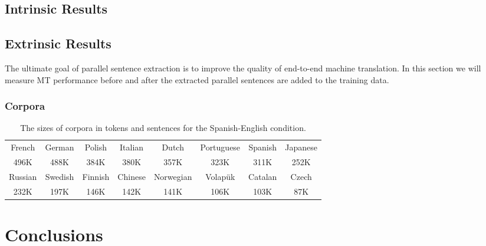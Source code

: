 \subsection{Intrinsic Results}

\subsection{Extrinsic Results}
The ultimate goal of parallel sentence extraction is to improve the quality of
end-to-end machine translation. In this section we will measure MT performance
before and after the extracted parallel sentences are added to the training
data.

\subsubsection{Corpora}
\begin{table}
\small
\begin{center}
\begin{tabular}{|c|c|c|c|c|c|c|c|}
\hline
French & German & Polish & Italian & Dutch & Portuguese & Spanish & Japanese \\
496K & 488K & 384K & 380K & 357K & 323K & 311K & 252K\\
\hline
Russian & Swedish & Finnish & Chinese & Norwegian & Volap\"{u}k & Catalan & Czech \\
232K & 197K & 146K & 142K & 141K & 106K & 103K & 87K\\
\hline
\end{tabular}
\end{center}
\caption{The sizes of corpora in tokens and sentences for the Spanish-English
condition.}
\label{table:esen_corpora}
\end{table}

\section{Conclusions}
